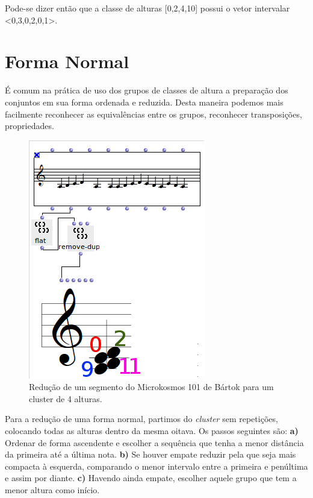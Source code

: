 \documentclass[
	12pt,				%
	openright,			%
	twoside,			%
	a4paper,			%
	english,			%
	french,				%
	spanish,			%
	brazil				%
	]{abntex2}
\begin{document}
\begin{apendicesenv}
Pode-se dizer então que a classe de alturas [0,2,4,10] possui o vetor intervalar <0,3,0,2,0,1>.


\section{Forma Normal} 

É comum na prática de uso dos grupos de classes de altura a preparação dos conjuntos em sua forma ordenada e reduzida. Desta maneira podemos mais facilmente reconhecer as equivalências entre os grupos, reconhecer transposições, propriedades.


\begin{figure}[h]
	\caption{\label{fig_grafico}Redução de um segmento do Microkosmos 101 de Bártok para um cluster de 4 alturas. }
	\begin{center}
	    \includegraphics[scale=0.7]{OM_settheory/reducao_acorde.png}
	\end{center}
\end{figure}

Para a redução de uma forma normal, partimos do \textit{cluster} sem repetições, colocando todas as alturas dentro da mesma oitava. Os passos seguintes são: 
\textbf{a)} Ordenar de forma ascendente e escolher a sequência que tenha a menor distância da primeira até a última nota.
\textbf{b)} Se houver empate reduzir pela que seja mais compacta à esquerda, comparando o menor intervalo entre a primeira e penúltima e assim por diante.
\textbf{c)} Havendo ainda empate, escolher aquele grupo que tem a menor altura como início. 


\end{apendicesenv}
\end{document}
